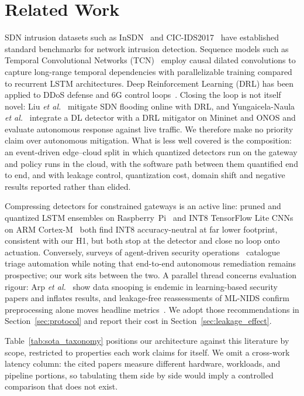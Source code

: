 \documentclass[conference,a4paper]{IEEEtran}
\begin{document}
\section{Related Work}
SDN intrusion datasets such as InSDN~\cite{b1} and CIC-IDS2017~\cite{b2} have established standard benchmarks for network intrusion detection. Sequence models such as Temporal Convolutional Networks (TCN)~\cite{b3} employ causal dilated convolutions to capture long-range temporal dependencies with parallelizable training compared to recurrent LSTM architectures. Deep Reinforcement Learning (DRL) has been applied to DDoS defense and 6G control loops~\cite{b4}. Closing the loop is not itself novel: Liu \emph{et al.}~\cite{b27} mitigate SDN flooding online with DRL, and Yungaicela-Naula \emph{et al.}~\cite{b28} integrate a DL detector with a DRL mitigator on Mininet and ONOS and evaluate autonomous response against live traffic. We therefore make no priority claim over autonomous mitigation. What is less well covered is the composition: an event-driven edge--cloud split in which quantized detectors run on the gateway and policy runs in the cloud, with the software path between them quantified end to end, and with leakage control, quantization cost, domain shift and negative results reported rather than elided.

Compressing detectors for constrained gateways is an active line: pruned and quantized LSTM ensembles on Raspberry~Pi~\cite{b20} and INT8 TensorFlow Lite CNNs on ARM Cortex-M~\cite{b21} both find INT8 accuracy-neutral at far lower footprint, consistent with our H1, but both stop at the detector and close no loop onto actuation. Conversely, surveys of agent-driven security operations~\cite{b22} catalogue triage automation while noting that end-to-end autonomous remediation remains prospective; our work sits between the two. A parallel thread concerns evaluation rigour: Arp \emph{et al.}~\cite{b23} show data snooping is endemic in learning-based security papers and inflates results, and leakage-free reassessments of ML-NIDS confirm preprocessing alone moves headline metrics~\cite{b24}. We adopt those recommendations in Section~\ref{sec:protocol} and report their cost in Section~\ref{sec:leakage_effect}.

Table~\ref{tab:sota_taxonomy} positions our architecture against this literature by scope, restricted to properties each work claims for itself. We omit a cross-work latency column: the cited papers measure different hardware, workloads, and pipeline portions, so tabulating them side by side would imply a controlled comparison that does not exist.
\end{document}

